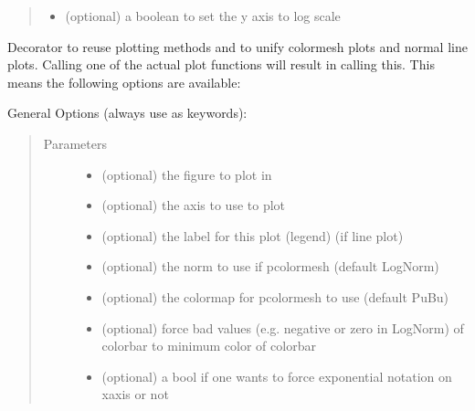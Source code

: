 \documentclass[letterpaper,10pt,openany,oneside,english]{sphinxmanual}
\begin{document}
\begin{fulllineitems}
\begin{fulllineitems}
\begin{quote}
\begin{description}
\begin{itemize}
\item {} 
 \textendash{} (optional) a boolean to set the y axis to log scale

\end{itemize}

\end{description}\end{quote}

\end{fulllineitems}


\begin{fulllineitems}
\label{\detokenize{plots:plots.SimplePlotter.meshPlot}}
Decorator to reuse plotting methods and to unify colormesh plots and normal line plots.  
Calling one of the actual plot functions will result in calling this.  
This means the following options are available:

General Options (always use as keywords):
\begin{quote}\begin{description}
\item[{Parameters}] \leavevmode\begin{itemize}
\item {} 
 \textendash{} (optional) the figure to plot in

\item {} 
 \textendash{} (optional) the axis to use to plot

\item {} 
 \textendash{} (optional) the label for this plot (legend) (if line plot)

\item {} 
 \textendash{} (optional) the norm to use if pcolormesh (default LogNorm)

\item {} 
 \textendash{} (optional) the colormap for pcolormesh to use (default PuBu)

\item {} 
 \textendash{} (optional) force bad values (e.g. negative or zero in LogNorm) of colorbar to minimum color of colorbar

\item {} 
 \textendash{} (optional) a bool if one wants to force exponential notation on xaxis or not


\end{itemize}
\end{description}
\end{quote}
\end{fulllineitems}
\end{fulllineitems}
\end{document}
